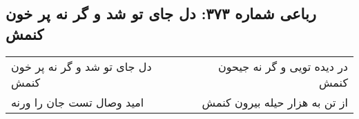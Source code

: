 \begin{center}
\section*{رباعی شماره ۳۷۳: دل جای تو شد و گر نه پر خون کنمش}
\label{sec:sh373}
\begin{longtable}{l p{0.5cm} r}
دل جای تو شد و گر نه پر خون کنمش
&&
در دیده تویی و گر نه جیحون کنمش
\\
امید وصال تست جان را ورنه
&&
از تن به هزار حیله بیرون کنمش
\\
\end{longtable}
\end{center}
